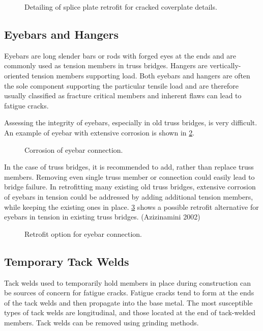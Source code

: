 \begin{figure}
  \caption{Detailing of splice plate retrofit for cracked coverplate details.}
  \label{fig:detail-splice-plate-retrofit-cracked-coverplate}
\end{figure}

\subsection{Eyebars and Hangers}
Eyebars are long slender bars or rods with forged eyes at the ends and are commonly used as tension members in
truss bridges. Hangers are vertically-oriented tension members supporting load. Both eyebars and hangers are often
the sole component supporting the particular tensile load and are therefore usually classified as fracture critical
members and inherent flaws can lead to fatigue cracks.

Assessing the integrity of eyebars, especially in old truss bridges, is very difficult. An example of eyebar with
extensive corrosion is shown in \cref{fig:corrosion-eyebar-connection}.

\begin{figure}
  \caption{Corrosion of eyebar connection.}
  \label{fig:corrosion-eyebar-connection}
\end{figure}

In the case of truss bridges, it is recommended to add, rather than replace truss members. Removing even single
truss member or connection could easily lead to bridge failure. In retrofitting many existing old truss bridges,
extensive corrosion of eyebars in tension could be addressed by adding additional tension members, while keeping
the existing ones in place. \cref{fig:retrofit-option-eyebar-connection} shows a possible retrofit alternative for eyebars in tension in existing truss
bridges. (Azizinamini 2002)

\begin{figure}
  \caption{Retrofit option for eyebar connection.}
  \label{fig:retrofit-option-eyebar-connection}
\end{figure}

\subsection{Temporary Tack Welds}
Tack welds used to temporarily hold members in place during construction can be sources of concern for fatigue
cracks. Fatigue cracks tend to form at the ends of the tack welds and then propagate into the base metal. The most
susceptible types of tack welds are longitudinal, and those located at the end of tack-welded members. Tack welds
can be removed using grinding methods.


